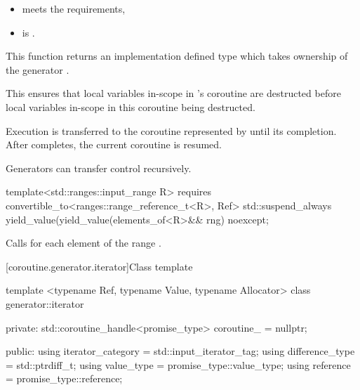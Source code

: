 \documentclass{wg21}
\begin{document}
\begin{addedblock}
\begin{itemdescr}
    
\mandates
\begin{itemize}
\item {} meets the  requirements,
\item {} is .
\end{itemize}
    
\effects
This function returns an implementation defined  type which takes ownership of the generator .

\begin{note}
This ensures that local variables in-scope in 's coroutine are destructed before local variables in-scope in this coroutine being destructed.
\end{note} 


Execution is transferred to the coroutine represented by   until its completion. 
After  completes, the current coroutine is resumed.


\begin{note}
Generators can transfer control recursively.
\end{note} 
    
\end{itemdescr}


\begin{itemdecl}
template<std::ranges::input_range R>
requires convertible_to<ranges::range_reference_t<R>, Ref>
std::suspend_always yield_value(yield_value(elements_of<R>&& rng) noexcept;
\end{itemdecl}

\begin{itemdescr}
\effects
Calls  for each element  of the range . 
\end{itemdescr}


[coroutine.generator.iterator]{Class template }

\begin{codeblock}
    
template <typename Ref, typename Value, typename Allocator>
class generator::iterator {
    private:
    std::coroutine_handle<promise_type> coroutine_ = nullptr;
    
    
    public:    
    using iterator_category = std::input_iterator_tag;
    using difference_type = std::ptrdiff_t;
    using value_type = promise_type::value_type;
    using reference = promise_type::reference;
    
}
\end{codeblock}
\end{addedblock}
\end{document}
